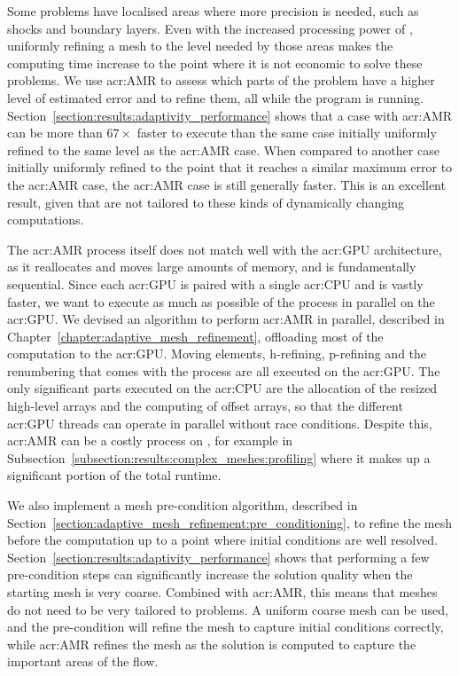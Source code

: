 Some problems have localised areas where more precision is needed, such as shocks and boundary
layers. Even with the increased processing power of , uniformly refining a mesh
to the level needed by those areas makes the computing time increase to the point where it is not
economic to solve these problems. We use \acrlong{acr:AMR} to assess which parts of the problem have
a higher level of estimated error and to refine them, all while the program is running.
Section~\ref{section:results:adaptivity_performance} shows that a case with \acrshort{acr:AMR} can
be more than \(67 \times \) faster to execute than the same case initially uniformly refined to the
same level as the \acrshort{acr:AMR} case. When compared to another case initially uniformly refined
to the point that it reaches a similar maximum error to the \acrshort{acr:AMR} case, the
\acrshort{acr:AMR} case is still generally faster. This is an excellent result, given that
 are not tailored to these kinds of dynamically changing computations. 

The \acrshort{acr:AMR} process itself does not match well with the \acrshort{acr:GPU} architecture,
as it reallocates and moves large amounts of memory, and is fundamentally sequential. Since each
\acrshort{acr:GPU} is paired with a single \acrshort{acr:CPU} and is vastly faster, we want to
execute as much as possible of the process in parallel on the \acrshort{acr:GPU}. We devised an
algorithm to perform \acrshort{acr:AMR} in parallel, described in
Chapter~\ref{chapter:adaptive_mesh_refinement}, offloading most of the computation to the
\acrshort{acr:GPU}. Moving elements, h-refining, p-refining and the renumbering that comes with the
process are all executed on the \acrshort{acr:GPU}. The only significant parts executed on the
\acrshort{acr:CPU} are the allocation of the resized high-level arrays and the computing of offset
arrays, so that the different \acrshort{acr:GPU} threads can operate in parallel without race
conditions. Despite this, \acrshort{acr:AMR} can be a costly process on , for
example in Subsection~\ref{subsection:results:complex_meshes:profiling} where it makes up a
significant portion of the total runtime.

We also implement a mesh pre-condition algorithm, described in
Section~\ref{section:adaptive_mesh_refinement:pre_conditioning}, to refine the mesh before the
computation up to a point where initial conditions are well resolved.
Section~\ref{section:results:adaptivity_performance} shows that performing a few pre-condition steps
can significantly increase the solution quality when the starting mesh is very coarse. Combined with
\acrshort{acr:AMR}, this means that meshes do not need to be very tailored to problems. A uniform
coarse mesh can be used, and the pre-condition will refine the mesh to capture initial conditions
correctly, while \acrshort{acr:AMR} refines the mesh as the solution is computed to capture the
important areas of the flow.

